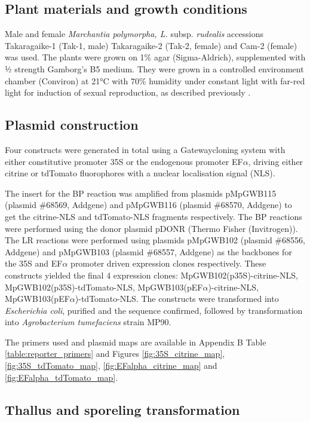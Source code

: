 \subsection{Plant materials and growth conditions}

Male and female \textit{Marchantia polymorpha, L.} subsp. \textit{rudealis} accessions Takaragaike-1 (Tak-1, male) Takaragaike-2 (Tak-2, female) and Cam-2 (female) was used. The plants were grown on 1\% agar (Sigma-Aldrich), supplemented with ½ strength Gamborg's B5 medium. They were grown in a controlled environment chamber (Conviron) at 21°C with 70\% humidity under constant light with far-red light for induction of sexual reproduction, as described previously \citep{RN212,RN254}.

\subsection{Plasmid construction}

Four constructs were generated in total  using a Gateway\textregistered cloning system with either constitutive promoter 35S or the endogenous promoter EF$\alpha$, driving either citrine or tdTomato fluorophores with a nuclear localisation signal (NLS).

The insert for the BP reaction was amplified from plasmids pMpGWB115 (plasmid \#68569, Addgene) and pMpGWB116 (plasmid \#68570, Addgene) \citep{RN72} to get the citrine-NLS and tdTomato-NLS fragments respectively. The BP reactions were performed using the donor plasmid pDONR (Thermo Fisher (Invitrogen)). The LR reactions were performed using plasmids pMpGWB102 (plasmid \#68556, Addgene) and pMpGWB103 (plasmid \#68557, Addgene)\citep{RN72} as the backbones for the 35S and EF$\alpha$ promoter driven expression clones respectively. These constructs yielded the final 4 expression clones: MpGWB102(p35S)-citrine-NLS, MpGWB102(p35S)-tdTomato-NLS, MpGWB103(pEF$\alpha$)-citrine-NLS, MpGWB103(pEF$\alpha$)-tdTomato-NLS. The constructs were transformed into \textit{Escherichia  coli}, purified and the sequence confirmed, followed by transformation into \textit{Agrobacterium tumefaciens} strain MP90.

The primers used and plasmid maps are available in Appendix B Table \ref{table:reporter_primers} and Figures \ref{fig:35S_citrine_map}, \ref{fig:35S_tdTomato_map}, \ref{fig:EFalpha_citrine_map} and \ref{fig:EFalpha_tdTomato_map}.

\subsection{Thallus and sporeling transformation}

